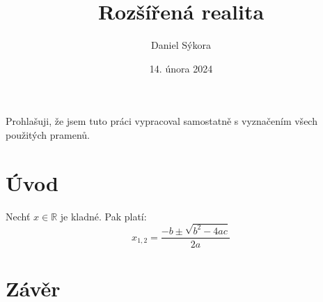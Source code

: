 \documentclass[12pt]{report}
\author{Daniel Sýkora}
\title{Rozšířená realita}
\date{14. února 2024}
\begin{document}
\mytitlepage
\prohlaseni
{
	Prohlašuji, že jsem tuto práci vypracoval samostatně s vyznačením všech použitých pramenů.
}
\abstrakt
{ %
	\lipsum[1]
}
{ %
	\lipsum[1]
}
\podekovani
{
	\lipsum[2]
}
\tableofcontents
\newpage


\chapter*{Úvod}

\lipsum[1]

Nechť $x \in \mathbb{R}$ je kladné. Pak platí:
\begin{equation}
	x_{1,2} = \frac{-b \pm \sqrt{b^2 - 4ac}}{2a}
	\label{quad_eq}
\end{equation}




\appendix
{}

\chapter*{Závěr}

\lipsum[1]

\nocite{*}
\printbibliography
{}

\printglossary[title={Zkratky}]

\listoffigures
\listoftables
\end{document}
